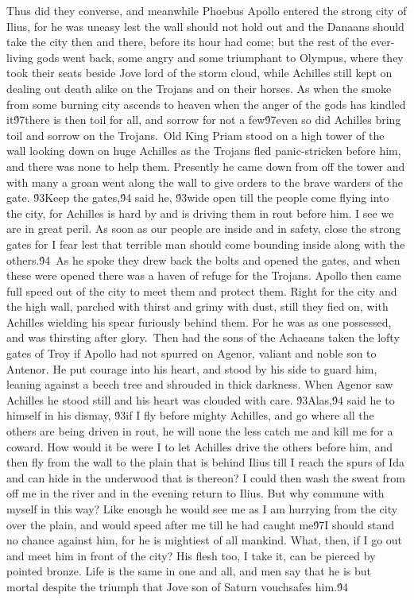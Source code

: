 {Thus did they converse, and meanwhile Phoebus Apollo entered the strong city of Ilius, for he was uneasy lest the wall should not hold out and the Danaans should take the city then and there, before its hour had come; but the rest of the ever-living gods went back, some angry and some triumphant to Olympus, where they took their seats beside Jove lord of the storm cloud, while Achilles still kept on dealing out death alike on the Trojans and on their horses. As when the smoke from some burning city ascends to heaven when the anger of the gods has kindled it\'97there is then toil for all, and sorrow for not a few\'97even so did Achilles bring toil and sorrow on the Trojans.\
Old King Priam stood on a high tower of the wall looking down on huge Achilles as the Trojans fled panic-stricken before him, and there was none to help them. Presently he came down from off the tower and with many a groan went along the wall to give orders to the brave warders of the gate. \'93Keep the gates,\'94 said he, \'93wide open till the people come flying into the city, for Achilles is hard by and is driving them in rout before him. I see we are in great peril. As soon as our people are inside and in safety, close the strong gates for I fear lest that terrible man should come bounding inside along with the others.\'94\
As he spoke they drew back the bolts and opened the gates, and when these were opened there was a haven of refuge for the Trojans. Apollo then came full speed out of the city to meet them and protect them. Right for the city and the high wall, parched with thirst and grimy with dust, still they fied on, with Achilles wielding his spear furiously behind them. For he was as one possessed, and was thirsting after glory.\
Then had the sons of the Achaeans taken the lofty gates of Troy if Apollo had not spurred on Agenor, valiant and noble son to Antenor. He put courage into his heart, and stood by his side to guard him, leaning against a beech tree and shrouded in thick darkness. When Agenor saw Achilles he stood still and his heart was clouded with care. \'93Alas,\'94 said he to himself in his dismay, \'93if I fly before mighty Achilles, and go where all the others are being driven in rout, he will none the less catch me and kill me for a coward. How would it be were I to let Achilles drive the others before him, and then fly from the wall to the plain that is behind Ilius till I reach the spurs of Ida and can hide in the underwood that is thereon? I could then wash the sweat from off me in the river and in the evening return to Ilius. But why commune with myself in this way? Like enough he would see me as I am hurrying from the city over the plain, and would speed after me till he had caught me\'97I should stand no chance against him, for he is mightiest of all mankind. What, then, if I go out and meet him in front of the city? His flesh too, I take it, can be pierced by pointed bronze. Life is the same in one and all, and men say that he is but mortal despite the triumph that Jove son of Saturn vouchsafes him.\'94\
}
